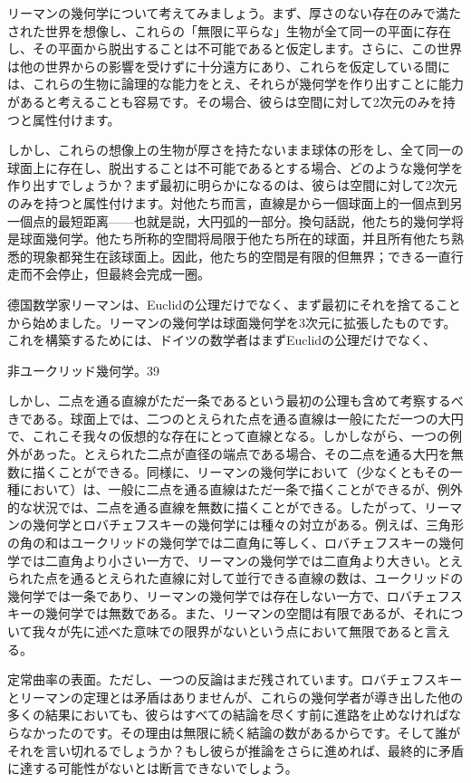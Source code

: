 \documentclass[a4paper,11pt,openany]{ltjsbook}
\begin{document}
リーマンの幾何学について考えてみましょう。まず、厚さのない存在のみで満たされた世界を想像し、これらの「無限に平らな」生物が全て同一の平面に存在し、その平面から脱出することは不可能であると仮定します。さらに、この世界は他の世界からの影響を受けずに十分遠方にあり、これらを仮定している間には、これらの生物に論理的な能力をとえ、それらが幾何学を作り出すことに能力があると考えることも容易です。その場合、彼らは空間に対して2次元のみを持つと属性付けます。

しかし、これらの想像上の生物が厚さを持たないまま球体の形をし、全て同一の球面上に存在し、脱出することは不可能であるとする場合、どのような幾何学を作り出すでしょうか？まず最初に明らかになるのは、彼らは空間に対して2次元のみを持つと属性付けます。対他たち而言，直線是から一個球面上的一個点到另一個点的最短距离——也就是説，大円弧的一部分。換句話説，他たち的幾何学将是球面幾何学。他たち所称的空間将局限于他たち所在的球面，并且所有他たち熟悉的現象都発生在該球面上。因此，他たち的空間是有限的但無界；できる一直行走而不会停止，但最終会完成一圈。

德国数学家リーマンは、Euclidの公理だけでなく、まず最初にそれを捨てることから始めました。リーマンの幾何学は球面幾何学を3次元に拡張したものです。これを構築するためには、ドイツの数学者はまずEuclidの公理だけでなく、

非ユークリッド幾何学。39

しかし、二点を通る直線がただ一条であるという最初の公理も含めて考察するべきである。球面上では、二つのとえられた点を通る直線は一般にただ一つの大円で、これこそ我々の仮想的な存在にとって直線となる。しかしながら、一つの例外があった。とえられた二点が直径の端点である場合、その二点を通る大円を無数に描くことができる。同様に、リーマンの幾何学において（少なくともその一種において）は、一般に二点を通る直線はただ一条で描くことができるが、例外的な状況では、二点を通る直線を無数に描くことができる。したがって、リーマンの幾何学とロバチェフスキーの幾何学には種々の対立がある。例えば、三角形の角の和はユークリッドの幾何学では二直角に等しく、ロバチェフスキーの幾何学では二直角より小さい一方で、リーマンの幾何学では二直角より大きい。とえられた点を通るとえられた直線に対して並行できる直線の数は、ユークリッドの幾何学では一条であり、リーマンの幾何学では存在しない一方で、ロバチェフスキーの幾何学では無数である。また、リーマンの空間は有限であるが、それについて我々が先に述べた意味での限界がないという点において無限であると言える。

定常曲率の表面。ただし、一つの反論はまだ残されています。ロバチェフスキーとリーマンの定理とは矛盾はありませんが、これらの幾何学者が導き出した他の多くの結果においても、彼らはすべての結論を尽くす前に進路を止めなければならなかったのです。その理由は無限に続く結論の数があるからです。そして誰がそれを言い切れるでしょうか？もし彼らが推論をさらに進めれば、最終的に矛盾に達する可能性がないとは断言できないでしょう。
\end{document}
